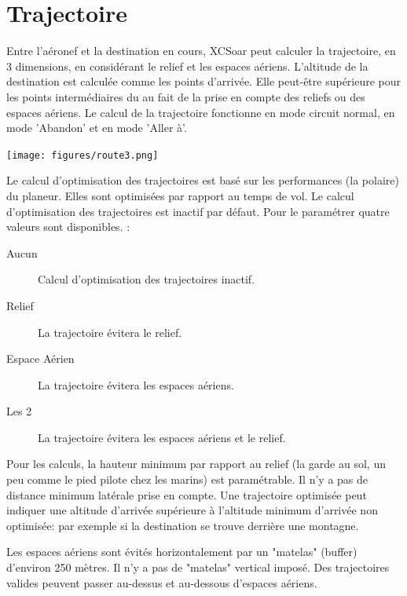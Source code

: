 \section{Trajectoire}\label{sec:route}
Entre l'aéronef et la destination en cours, XCSoar peut calculer la trajectoire, en 3 dimensions,  en considérant le relief et les espaces aériens. L'altitude de la destination est calculée comme les points d'arrivée. Elle peut-être supérieure pour les points intermédiaires du au fait de la prise en compte des reliefs ou des espaces aériens.
Le calcul de la trajectoire fonctionne en mode circuit normal, en mode 'Abandon' et en mode 'Aller à'.

\begin{center}
\texttt{[image: figures/route3.png]}
\end{center}

Le calcul  d'optimisation des trajectoires est basé sur les performances (la polaire) du planeur. Elles sont optimisées par rapport au temps de vol. Le calcul d'optimisation des trajectoires est inactif par défaut. Pour le paramétrer quatre valeurs sont disponibles. :
\begin{description}
\item[Aucun] Calcul d'optimisation des trajectoires inactif.
\item[Relief] La trajectoire évitera le relief.
\item[Espace Aérien]  La trajectoire évitera les espaces aériens.
\item[Les 2] La trajectoire évitera les espaces aériens et le relief.
\end{description}

Pour les calculs, la hauteur minimum par rapport au relief (la garde au sol, un peu comme le pied pilote chez les marins) est paramétrable.  Il n'y a pas de distance minimum latérale prise en compte.
Une trajectoire optimisée peut indiquer une altitude d'arrivée supérieure à l'altitude minimum d'arrivée non optimisée: par exemple si la destination se trouve derrière une montagne.

Les espaces aériens sont évités horizontalement par un "matelas" (buffer) d'environ 250 mètres. Il n'y a pas de "matelas" vertical imposé. Des trajectoires valides peuvent passer au-dessus et au-dessous d'espaces aériens.


